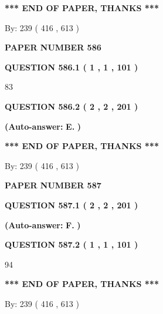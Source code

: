 \documentclass{ctexart}
\begin{document}
 
   
   
   
   
\vspace{1.0in} 
{\textbf{\large{ *** END OF PAPER, THANKS *** }}} 
   
   
\hspace{1.0in} By: 
 239 ( 416 ,  613 )
   
   
   
   
\newpage 
\setcounter{page}{ 
   586001 } 
   
   
 {\textbf{ \Large{ PAPER NUMBER  586  }}}
   
   
   
   
  
  
{\textbf{\large{QUESTION
586.1 
 ( 1 , 1 , 101 )
}}}

83
  
  
{\textbf{\large{QUESTION
586.2 
 ( 2 , 2 , 201 )
}}}
 
 
{\textbf{(Auto-answer:}}
{\textbf{\large{
E.}}}
{\textbf{)}}
 
 
   
   
   
   
\vspace{1.0in} 
{\textbf{\large{ *** END OF PAPER, THANKS *** }}} 
   
   
\hspace{1.0in} By: 
 239 ( 416 ,  613 )
   
   
   
   
\newpage 
\setcounter{page}{ 
   587001 } 
   
   
 {\textbf{ \Large{ PAPER NUMBER  587  }}}
   
   
   
   
  
  
{\textbf{\large{QUESTION
587.1 
 ( 2 , 2 , 201 )
}}}
 
 
{\textbf{(Auto-answer:}}
{\textbf{\large{
F.}}}
{\textbf{)}}
 
 
  
  
{\textbf{\large{QUESTION
587.2 
 ( 1 , 1 , 101 )
}}}

94
   
   
   
   
\vspace{1.0in} 
{\textbf{\large{ *** END OF PAPER, THANKS *** }}} 
   
   
\hspace{1.0in} By: 
 239 ( 416 ,  613 )
   
   
   
   
\newpage 
\setcounter{page}{ 
   588001 } 
   
\end{document}

